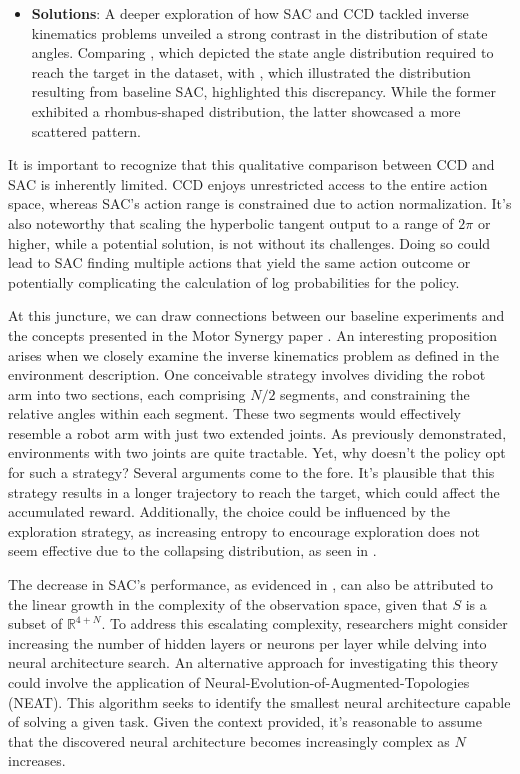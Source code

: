 \begin{itemize}
    \item \textbf{Solutions}: A deeper exploration of how SAC and CCD tackled inverse kinematics problems unveiled a strong contrast in the distribution of state angles. Comparing , which depicted the state angle distribution required to reach the target in the dataset, with , which illustrated the distribution resulting from baseline SAC, highlighted this discrepancy. While the former exhibited a rhombus-shaped distribution, the latter showcased a more scattered pattern.
\end{itemize}

It is important to recognize that this qualitative comparison between CCD and SAC is inherently limited. CCD enjoys unrestricted access to the entire action space, whereas SAC's action range is constrained due to action normalization. It's also noteworthy that scaling the hyperbolic tangent output to a range of $2\pi$ or higher, while a potential solution, is not without its challenges. Doing so could lead to SAC finding multiple actions that yield the same action outcome or potentially complicating the calculation of log probabilities for the policy.

At this juncture, we can draw connections between our baseline experiments and the concepts presented in the Motor Synergy paper \cite{Motor_Synergy_Learning}. An interesting proposition arises when we closely examine the inverse kinematics problem as defined in the environment description. One conceivable strategy involves dividing the robot arm into two sections, each comprising $N/2$ segments, and constraining the relative angles within each segment. These two segments would effectively resemble a robot arm with just two extended joints. As previously demonstrated, environments with two joints are quite tractable. Yet, why doesn't the policy opt for such a strategy? Several arguments come to the fore. It's plausible that this strategy results in a longer trajectory to reach the target, which could affect the accumulated reward. Additionally, the choice could be influenced by the exploration strategy, as increasing entropy to encourage exploration does not seem effective due to the collapsing distribution, as seen in .

The decrease in SAC's performance, as evidenced in , can also be attributed to the linear growth in the complexity of the observation space, given that $S$ is a subset of $\mathbb{R}^{4+N}$. To address this escalating complexity, researchers might consider increasing the number of hidden layers or neurons per layer while delving into neural architecture search. An alternative approach for investigating this theory could involve the application of Neural-Evolution-of-Augmented-Topologies (NEAT). This algorithm seeks to identify the smallest neural architecture capable of solving a given task. Given the context provided, it's reasonable to assume that the discovered neural architecture becomes increasingly complex as $N$ increases.




